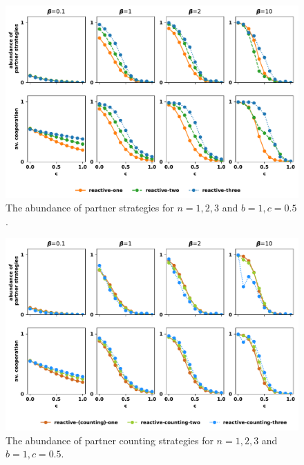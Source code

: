 \documentclass{article}
\theoremstyle{definition}
\begin{document}
\begin{figure}[!htbp]
  \includegraphics[width=\textwidth]{figures/abundance_of_partner_strategies.pdf}
  \caption{The abundance of partner strategies for $n=1,2,3$ and $b=1, c=0.5$.}
\end{figure}

\begin{figure}[!htbp]
  \includegraphics[width=\textwidth]{figures/abundance_of_partner_counting_strategies.pdf}
  \caption{The abundance of partner counting strategies for $n=1,2,3$ and $b=1, c=0.5$.}
\end{figure}
\end{document}

